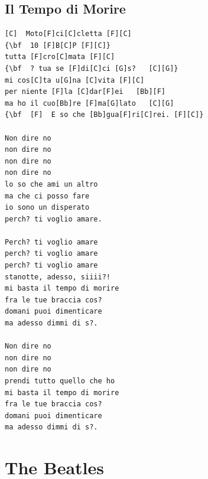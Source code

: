 \documentclass[a4paper]{article}
\begin{document}
\subsection{Il Tempo di Morire}
\begin{multicols}{2}\begin{Verbatim}[commandchars=\\\{\}]
[C]  Moto[F]ci[C]cletta [F][C]
{\bf  10 [F]B[C]P [F][C]}
tutta [F]cro[C]mata [F][C]
{\bf  ? tua se [F]di[C]ci [G]s?   [C][G]}
mi cos[C]ta u[G]na [C]vita [F][C]
per niente [F]la [C]dar[F]ei   [Bb][F]
ma ho il cuo[Bb]re [F]ma[G]lato   [C][G]
{\bf  [F]  E so che [Bb]gua[F]ri[C]rei. [F][C]}

Non dire no
non dire no
non dire no
non dire no
lo so che ami un altro
ma che ci posso fare
io sono un disperato
perch? ti voglio amare.

Perch? ti voglio amare
perch? ti voglio amare
perch? ti voglio amare
stanotte, adesso, siiii?!
mi basta il tempo di morire
fra le tue braccia cos?
domani puoi dimenticare
ma adesso dimmi di s?.

Non dire no
non dire no
non dire no
prendi tutto quello che ho
mi basta il tempo di morire
fra le tue braccia cos?
domani puoi dimenticare
ma adesso dimmi di s?.

\end{Verbatim}
\end{multicols}\newpage
\section{The Beatles}
\end{document}
